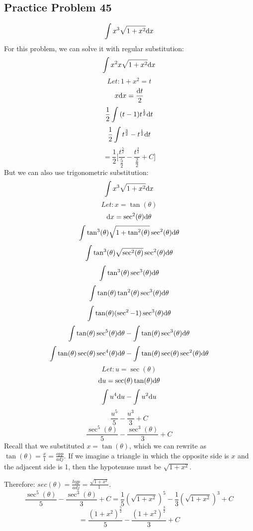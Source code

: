 \documentclass{math}
\begin{document}
\subsection*{Practice Problem 45}
\[ \int{x^{3}\sqrt{1+x^{2}}\mathrm{d}{x}} \]
For this problem, we can solve it with regular substitution:
\[ \int{x^{2}x\sqrt{1+x^{2}}\mathrm{d}{x}} \]
\[ Let: 1+x^{2} = t \]
\[ x\mathrm{d}{x} = \frac{\mathrm{d}{t}}{2} \]
\[ \frac{1}{2}\int{(t-1)t^{\frac{1}{2}}\mathrm{d}{t}} \]
\[ \frac{1}{2}\int{t^{\frac{3}{2}}-t^{\frac{1}{2}}\mathrm{d}{t}} \]
\[ = \frac{1}{2}\bigg[\frac{t^{\frac{5}{2}}}{\frac{5}{2}}-
     \frac{t^{\frac{3}{2}}}{\frac{2}{2}}+C\bigg] \]
But we can also use trigonometric substitution:
\[ \int{x^{3}\sqrt{1+x^{2}}\mathrm{d}{x}} \]
\[ Let: x = \tan(\theta) \]
\[ \mathrm{d}{x} = \sec^{2}(\theta)\mathrm{d}{\theta} \]
\[ \int{\tan^{3}(\theta)\sqrt{1+\tan^{2}(\theta)}
   \sec^{2}(\theta)\mathrm{d}{\theta}} \]
\[ \int{\tan^{3}(\theta)\sqrt{\sec^{2}(\theta)}
   \sec^{2}(\theta)\mathrm{d}{\theta}} \]
\[ \int{\tan^{3}(\theta)\sec^{3}(\theta)\mathrm{d}{\theta}} \]
\[ \int{\tan(\theta)\tan^{2}(\theta)\sec^{3}(\theta)\mathrm{d}{\theta}} \]
\[ \int{\tan(\theta)(\sec^{2}-1)\sec^{3}(\theta)\mathrm{d}{\theta}} \]
\[ \int{\tan(\theta)\sec^{5}(\theta)\mathrm{d}{\theta}}-
   \int{\tan(\theta)\sec^{3}(\theta)\mathrm{d}{\theta}} \]
\[ \int{\tan(\theta)\sec(\theta)\sec^{4}(\theta)\mathrm{d}{\theta}}-
   \int{\tan(\theta)\sec(\theta)\sec^{2}(\theta)\mathrm{d}{\theta}} \]
\[ Let: u = \sec(\theta) \]
\[ \mathrm{d}{u} = \sec(\theta)\tan(\theta)\mathrm{d}{\theta} \]
\[ \int{u^{4}\mathrm{d}{u}}- \int{u^{2}\mathrm{d}{u}} \]
\[ \frac{u^{5}}{5}-\frac{u^{3}}{3}+C \]
\[ \frac{\sec^{5}(\theta)}{5}-\frac{\sec^{3}(\theta)}{3}+C \]
Recall that we substituted \( x = \tan(\theta) \), which we can rewrite as
\( \tan(\theta) = \frac{x}{1} = \frac{opp}{adj} \). If we imagine a triangle in
which the opposite side is \( x \) and the adjacent side is 1, then the
hypotenuse must be \( \sqrt{1+x^{2}} \).
\begin{center}
\end{center}
Therefore: \( sec(\theta) = \frac{hyp}{adj} = \frac{\sqrt{1+x^{2}}}{1} \).
\[ \frac{\sec^{5}(\theta)}{5}-\frac{\sec^{3}(\theta)}{3}+C =
   \frac{1}{5}(\sqrt{1+x^{2}})^{5}-\frac{1}{3}(\sqrt{1+x^{2}})^{3}+C \]
\[ = \frac{(1+x^{2})^{\frac{5}{2}}}{5}-\frac{(1+x^{2})^{\frac{3}{2}}}{3}+C \]
\end{document}
